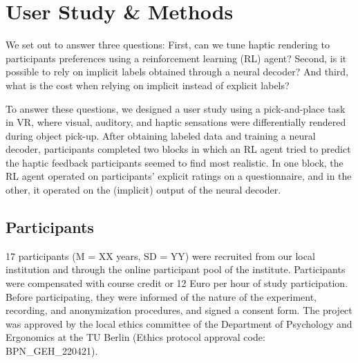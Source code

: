 

\section{User Study \& Methods}
We set out to answer three questions: First, can we tune haptic rendering to participants preferences using a reinforcement learning (RL) agent? Second, is it possible to rely on implicit labels obtained through a neural decoder? And third, what is the cost when relying on implicit instead of explicit labels?

To answer these questions, we designed a user study using a pick-and-place task in VR, where visual, auditory, and haptic sensations were differentially rendered during object pick-up. After obtaining labeled data and training a neural decoder, participants completed two blocks in which an RL agent tried to predict the haptic feedback participants seemed to find most realistic. In one block, the RL agent operated on participants' explicit ratings on a questionnaire, and in the other, it operated on the (implicit) output of the neural decoder.


\subsection{Participants} %
17 participants (M = XX years, SD = YY) were recruited from our local institution and through the online participant pool of the institute. Participants were compensated with course credit or 12 Euro per hour of study participation. Before participating, they were informed of the nature of the experiment, recording, and anonymization procedures, and signed a consent form. The project was approved by the local ethics committee of the Department of Psychology and Ergonomics at the TU Berlin (Ethics protocol approval code: BPN\_GEH\_220421).

